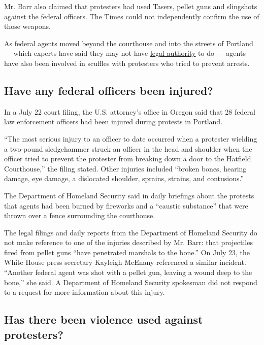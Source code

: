 Mr. Barr also claimed that protesters had used Tasers, pellet guns and
slingshots against the federal officers. The Times could not
independently confirm the use of those weapons.

As federal agents moved beyond the courthouse and into the streets of
Portland --- which experts have said they may not have
\href{https://www.nytimes.com/2020/07/25/us/portland-federal-legal-jurisdiction-courts.html}{legal
authority} to do --- agents have also been involved in scuffles with
protesters who tried to prevent arrests.

\hypertarget{have-any-federal-officers-been-injured}{%
\subsection{Have any federal officers been
injured?}\label{have-any-federal-officers-been-injured}}

In a July 22 court filing, the U.S. attorney's office in Oregon said
that 28 federal law enforcement officers had been injured during
protests in Portland.

``The most serious injury to an officer to date occurred when a
protester wielding a two-pound sledgehammer struck an officer in the
head and shoulder when the officer tried to prevent the protester from
breaking down a door to the Hatfield Courthouse,'' the filing stated.
Other injuries included ``broken bones, hearing damage, eye damage, a
dislocated shoulder, sprains, strains, and contusions.''

The Department of Homeland Security said in daily briefings about the
protests that agents had been burned by fireworks and a ``caustic
substance'' that were thrown over a fence surrounding the courthouse.

The legal filings and daily reports from the Department of Homeland
Security do not make reference to one of the injuries described by Mr.
Barr: that projectiles fired from pellet guns ``have penetrated marshals
to the bone.'' On July 23, the White House press secretary Kayleigh
McEnany referenced a similar incident. ``Another federal agent was shot
with a pellet gun, leaving a wound deep to the bone,'' she said. A
Department of Homeland Security spokesman did not respond to a request
for more information about this injury.

\hypertarget{has-there-been-violence-used-against-protesters}{%
\subsection{Has there been violence used against
protesters?}\label{has-there-been-violence-used-against-protesters}}

